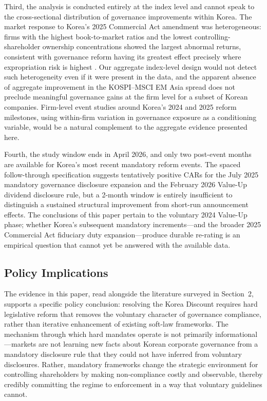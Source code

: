 Third, the analysis is conducted entirely at the index level and cannot speak to the cross-sectional distribution of governance improvements within Korea. The market response to Korea's 2025 Commercial Act amendment was heterogeneous: firms with the highest book-to-market ratios and the lowest controlling-shareholder ownership concentrations showed the largest abnormal returns, consistent with governance reform having its greatest effect precisely where expropriation risk is highest \citep{kang_commercial_act_market_reactions}. Our aggregate index-level design would not detect such heterogeneity even if it were present in the data, and the apparent absence of aggregate improvement in the KOSPI--MSCI EM Asia spread does not preclude meaningful governance gains at the firm level for a subset of Korean companies. Firm-level event studies around Korea's 2024 and 2025 reform milestones, using within-firm variation in governance exposure as a conditioning variable, would be a natural complement to the aggregate evidence presented here.

Fourth, the study window ends in April 2026, and only two post-event months are available for Korea's most recent mandatory reform events. The spaced follow-through specification suggests tentatively positive CARs for the July 2025 mandatory governance disclosure expansion and the February 2026 Value-Up dividend disclosure rule, but a 2-month window is entirely insufficient to distinguish a sustained structural improvement from short-run announcement effects. The conclusions of this paper pertain to the voluntary 2024 Value-Up phase; whether Korea's subsequent mandatory increments---and the broader 2025 Commercial Act fiduciary duty expansion---produce durable re-rating is an empirical question that cannot yet be answered with the available data.

\subsection{Policy Implications}

The evidence in this paper, read alongside the literature surveyed in Section~2, supports a specific policy conclusion: resolving the Korea Discount requires hard legislative reform that removes the voluntary character of governance compliance, rather than iterative enhancement of existing soft-law frameworks. The mechanism through which hard mandates operate is not primarily informational---markets are not learning new facts about Korean corporate governance from a mandatory disclosure rule that they could not have inferred from voluntary disclosures. Rather, mandatory frameworks change the strategic environment for controlling shareholders by making non-compliance costly and observable, thereby credibly committing the regime to enforcement in a way that voluntary guidelines cannot.

